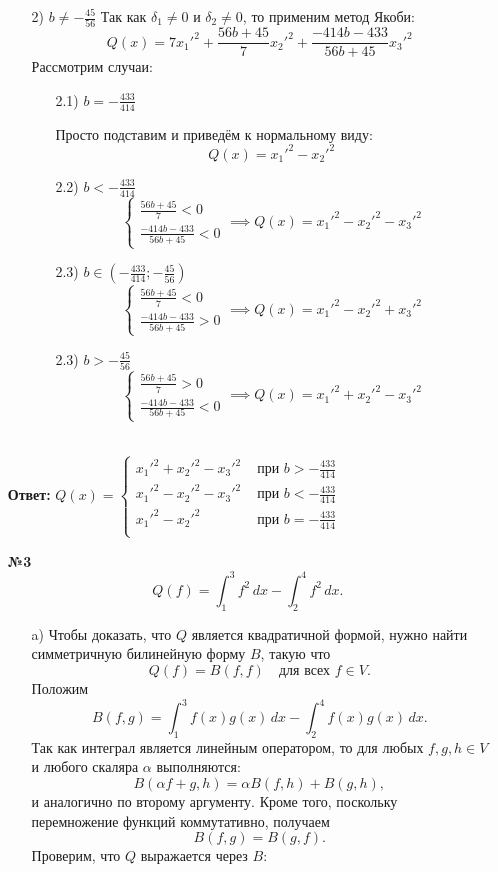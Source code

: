 \documentclass[a4paper]{article}
\renewcommand{\f}[2]{\frac{#1}{#2}}
\newcommand{\case}[1]{\begin{cases} #1 \end{cases}}
\begin{document}
\begin{enumerate}
\begin{enumerate}
        \item[2)]$b \neq -\f{45}{56}$
        Так как $\delta_1 \neq 0$ и $\delta_2 \neq 0$, то применим метод Якоби:
        $$Q(x) = 7x_1'^2+\f{56b+45}{7}x_2'^2+ \f{-414b - 433}{56b+45}x_3'^2$$
        Рассмотрим случаи:
        \begin{enumerate}
            \item[2.1)]$b = -\f{433}{414}$
            
            Просто подставим и приведём к нормальному виду:
            $$Q(x) = x_1'^2-x_2'^2$$

            \item[2.2)] $b < -\f{433}{414} $
            $$\case{
                \f{56b+45}{7} < 0\\
                \f{-414b - 433}{56b+45} < 0
            } \implies Q(x) = x_1'^2-x_2'^2-x_3'^2$$
            \item[2.3)] $b \in (-\f{433}{414}; -\f{45}{56}) $
            $$\case{
                \f{56b+45}{7} < 0\\
                \f{-414b - 433}{56b+45} > 0
            } \implies Q(x) = x_1'^2-x_2'^2+x_3'^2$$
            \item[2.3)] $b > -\f{45}{56} $
            $$\case{
                \f{56b+45}{7} > 0\\
                \f{-414b - 433}{56b+45} < 0
            } \implies Q(x) = x_1'^2+x_2'^2-x_3'^2$$\\

        \end{enumerate}
    \end{enumerate}

    \textbf{Ответ: }$Q(x) = \case{
        x_1'^2+x_2'^2-x_3'^2 & \text{ при } b > -\f{433}{414}\\
        x_1'^2-x_2'^2-x_3'^2 & \text{ при } b < -\f{433}{414}\\
        x_1'^2-x_2'^2& \text{ при } b = -\f{433}{414}\\
    }$\\

    \item[\textbf{№3}]\[ Q(f) = \int_{1}^{3} f^2 \, dx - \int_{2}^{4} f^2 \, dx. \]
    
    \begin{enumerate}
        \item[a)]Чтобы доказать, что \(Q\) является квадратичной формой, нужно найти симметричную билинейную форму \(B\), такую что
        \[
        Q(f)=B(f,f) \quad \text{для всех } f\in V.
        \]
        Положим
        \[
        B(f,g)=\int_{1}^{3} f(x)g(x)\,dx - \int_{2}^{4} f(x)g(x)\,dx.
        \]
        Так как интеграл является линейным оператором, то для любых \( f, g, h \in V \) и любого скаляра \(\alpha\) выполняются:
        \[
        B(\alpha f + g, h) = \alpha B(f,h) + B(g,h),
        \]
        и аналогично по второму аргументу. Кроме того, поскольку перемножение функций коммутативно, получаем
        \[
        B(f,g)=B(g,f).
        \]
        Проверим, что \(Q\) выражается через \(B\):


\end{enumerate}
\end{enumerate}
\end{document}
